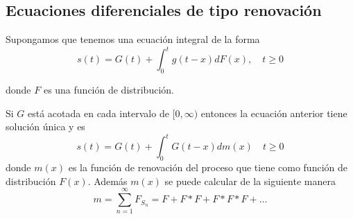 \documentclass[PREyA.tex]{subfiles}
\begin{document}
\subsection{Ecuaciones diferenciales de tipo renovación}
Supongamos que tenemos una ecuación integral de la forma
$$
s(t)=G(t) + \int_0^t g(t-x)dF(x), \quad t\geq 0
$$

donde $F$ es una función de distribución. 
\begin{theorem}
Si $G$ está acotada en cada intervalo de $[0,\infty)$ entonces la ecuación anterior tiene solución única y es
$$
s(t) = G(t) + \int_0^t G(t-x)dm(x) \quad t\geq 0
$$
donde $m(x)$ es la función de renovación del proceso que tiene como función de distribución $F(x)$. Además $m(x)$ se puede calcular de la siguiente manera
$$
m = \sum_{n=1}^\infty F_{S_n} = F + F*F + F*F*F + \dotsc
$$
\end{theorem}
\end{document}
